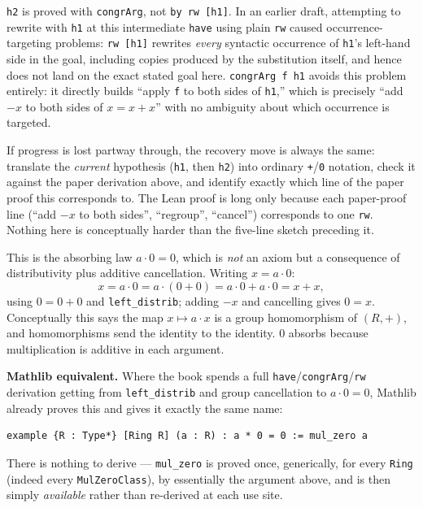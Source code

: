 \texttt{h2} is proved with \texttt{congrArg}, not \texttt{by rw [h1]}. In an earlier draft, attempting to rewrite with \texttt{h1} at this intermediate \texttt{have} using plain \texttt{rw} caused occurrence-targeting problems: \texttt{rw [h1]} rewrites \emph{every} syntactic occurrence of \texttt{h1}'s left-hand side in the goal, including copies produced by the substitution itself, and hence does not land on the exact stated goal here. \texttt{congrArg f h1} avoids this problem entirely: it directly builds ``apply \texttt{f} to both sides of \texttt{h1},'' which is precisely ``add \(-x\) to both sides of \(x = x+x\)'' with no ambiguity about which occurrence is targeted.

If progress is lost partway through, the recovery move is always the same: translate the \emph{current} hypothesis (\texttt{h1}, then \texttt{h2}) into ordinary \texttt{+}/\texttt{0} notation, check it against the paper derivation above, and identify exactly which line of the paper proof this corresponds to. The Lean proof is long only because each paper-proof line (``add \(-x\) to both sides'', ``regroup'', ``cancel'') corresponds to one \texttt{rw}. Nothing here is conceptually harder than the five-line sketch preceding it.

\begin{mathreading}

This is the absorbing law \(a\cdot 0 = 0\), which is \emph{not} an axiom but a consequence of distributivity plus additive cancellation. Writing \(x = a\cdot 0\): \[
x = a\cdot 0 = a\cdot(0+0) = a\cdot 0 + a\cdot 0 = x + x,
\] using \(0 = 0+0\) and \texttt{left\_\allowbreak{}distrib}; adding \(-x\) and cancelling gives \(0 = x\). Conceptually this says the map \(x \mapsto a\cdot x\) is a group homomorphism of \((R,+)\), and homomorphisms send the identity to the identity. \(0\) absorbs because multiplication is additive in each argument.

\end{mathreading}

\textbf{Mathlib equivalent.} Where the book spends a full \texttt{have}/\texttt{congrArg}/\texttt{rw} derivation getting from \texttt{left\_\allowbreak{}distrib} and group cancellation to \(a\cdot 0=0\), Mathlib already proves this and gives it exactly the same name:

\begin{lstlisting}
example {R : Type*} [Ring R] (a : R) : a * 0 = 0 := mul_zero a
\end{lstlisting}

There is nothing to derive --- \texttt{mul\_\allowbreak{}zero} is proved once, generically, for every \texttt{Ring} (indeed every \texttt{MulZeroClass}), by essentially the argument above, and is then simply \emph{available} rather than re-derived at each use site.
